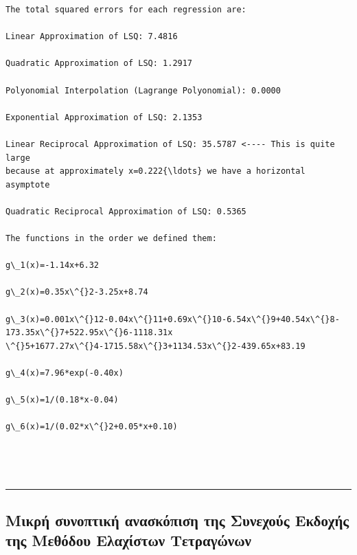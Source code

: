 \documentclass[12pt]{article}
\begin{document}
    \begin{Verbatim}[commandchars=\\\{\}]
The total squared errors for each regression are:

Linear Approximation of LSQ: 7.4816

Quadratic Approximation of LSQ: 1.2917

Polyonomial Interpolation (Lagrange Polyonomial): 0.0000

Exponential Approximation of LSQ: 2.1353

Linear Reciprocal Approximation of LSQ: 35.5787 <---- This is quite large
because at approximately x=0.222{\ldots} we have a horizontal asymptote

Quadratic Reciprocal Approximation of LSQ: 0.5365

The functions in the order we defined them:

g\_1(x)=-1.14x+6.32

g\_2(x)=0.35x\^{}2-3.25x+8.74

g\_3(x)=0.001x\^{}12-0.04x\^{}11+0.69x\^{}10-6.54x\^{}9+40.54x\^{}8-173.35x\^{}7+522.95x\^{}6-1118.31x
\^{}5+1677.27x\^{}4-1715.58x\^{}3+1134.53x\^{}2-439.65x+83.19

g\_4(x)=7.96*exp(-0.40x)

g\_5(x)=1/(0.18*x-0.04)

g\_6(x)=1/(0.02*x\^{}2+0.05*x+0.10)

    \end{Verbatim}

    \begin{center}
    \end{center}
    { \hspace*{\fill} \\}
    
    \begin{center}
    \end{center}
    { \hspace*{\fill} \\}
    
\begin{center}\rule{0.5\linewidth}{0.5pt}\end{center}    
    
\subsection{Μικρή συνοπτική ανασκόπιση της Συνεχούς Εκδοχής της Μεθόδου
Ελαχίστων Τετραγώνων}
\end{document}
